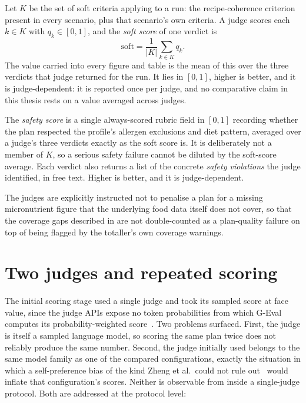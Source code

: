 \begin{definition}
    \label{def:soft-score}
    Let $K$ be the set of soft criteria applying to a run: the recipe-coherence criterion present in every scenario, plus that scenario's own criteria. A judge scores each $k \in K$ with $q_k \in [0, 1]$, and the \emph{soft score} of one verdict is
    \[
        \mathrm{soft} = \frac{1}{\left| K \right|} \sum_{k \in K} q_k.
    \]
    The value carried into every figure and table is the mean of this over the three verdicts that judge returned for the run. It lies in $[0, 1]$, higher is better, and it is judge-dependent: it is reported once per judge, and no comparative claim in this thesis rests on a value averaged across judges.
\end{definition}

\begin{definition}
    \label{def:safety-score}
    The \emph{safety score} is a single always-scored rubric field in $[0, 1]$ recording whether the plan respected the profile's allergen exclusions and diet pattern, averaged over a judge's three verdicts exactly as the soft score is. It is deliberately not a member of $K$, so a serious safety failure cannot be diluted by the soft-score average. Each verdict also returns a list of the concrete \emph{safety violations} the judge identified, in free text. Higher is better, and it is judge-dependent.
\end{definition}

The judges are explicitly instructed not to penalise a plan for a missing micronutrient figure that the underlying food data itself does not cover, so that the coverage gaps described in  are not double-counted as a plan-quality failure on top of being flagged by the totaller's own coverage warnings.

\section{Two judges and repeated scoring}
\label{sec:methodology-judge-protocol}

The initial scoring stage used a single judge and took its sampled score at face value, since the judge APIs expose no token probabilities from which G-Eval computes its probability-weighted score~\cite{liu2023geval}. Two problems surfaced. First, the judge is itself a sampled language model, so scoring the same plan twice does not reliably produce the same number. Second, the judge initially used belongs to the same model family as one of the compared configurations, exactly the situation in which a self-preference bias of the kind Zheng et al.\ could not rule out~\cite{zheng2023judging} would inflate that configuration's scores. Neither is observable from inside a single-judge protocol. Both are addressed at the protocol level:

